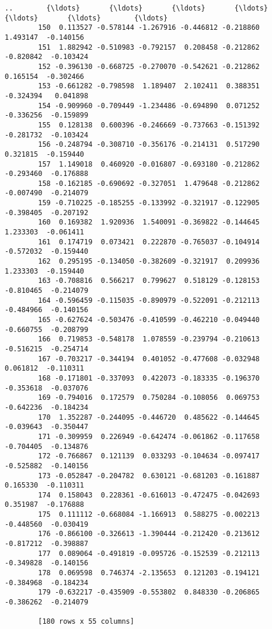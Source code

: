 \documentclass[11pt]{article}
\begin{document}
\begin{Verbatim}[commandchars=\\\{\}]
        ..        {\ldots}       {\ldots}       {\ldots}       {\ldots}       {\ldots}       {\ldots}        {\ldots}  
        150  0.113527 -0.578144 -1.267916 -0.446812 -0.218860  1.493147  -0.140156  
        151  1.882942 -0.510983 -0.792157  0.208458 -0.212862 -0.820842  -0.103424  
        152 -0.396130 -0.668725 -0.270070 -0.542621 -0.212862  0.165154  -0.302466  
        153 -0.661282 -0.798598  1.189407  2.102411  0.388351 -0.324394   0.041898  
        154 -0.909960 -0.709449 -1.234486 -0.694890  0.071252 -0.336256  -0.159899  
        155  0.128138  0.600396 -0.246669 -0.737663 -0.151392 -0.281732  -0.103424  
        156 -0.248794 -0.308710 -0.356176 -0.214131  0.517290  0.321815  -0.159440  
        157  1.149018  0.460920 -0.016807 -0.693180 -0.212862 -0.293460  -0.176888  
        158 -0.162185 -0.690692 -0.327051  1.479648 -0.212862 -0.007490  -0.214079  
        159 -0.710225 -0.185255 -0.133992 -0.321917 -0.122905 -0.398405  -0.207192  
        160  0.169382  1.920936  1.540091 -0.369822 -0.144645  1.233303  -0.061411  
        161  0.174719  0.073421  0.222870 -0.765037 -0.104914 -0.572032  -0.159440  
        162  0.295195 -0.134050 -0.382609 -0.321917  0.209936  1.233303  -0.159440  
        163 -0.708816  0.566217  0.799627  0.518129 -0.128153 -0.810465  -0.214079  
        164 -0.596459 -0.115035 -0.890979 -0.522091 -0.212113 -0.484966  -0.140156  
        165 -0.627624 -0.503476 -0.410599 -0.462210 -0.049440 -0.660755  -0.208799  
        166  0.719853 -0.548178  1.078559 -0.239794 -0.210613 -0.516215  -0.254714  
        167 -0.703217 -0.344194  0.401052 -0.477608 -0.032948  0.061812  -0.110311  
        168 -0.171801 -0.337093  0.422073 -0.183335 -0.196370 -0.353618  -0.037076  
        169 -0.794016  0.172579  0.750284 -0.108056  0.069753 -0.642236  -0.184234  
        170  1.352287 -0.244095 -0.446720  0.485622 -0.144645 -0.039643  -0.350447  
        171 -0.309959  0.226949 -0.642474 -0.061862 -0.117658 -0.704405  -0.134876  
        172 -0.766867  0.121139  0.033293 -0.104634 -0.097417 -0.525882  -0.140156  
        173 -0.052847 -0.204782  0.630121 -0.681203 -0.161887  0.165330  -0.110311  
        174  0.158043  0.228361 -0.616013 -0.472475 -0.042693  0.351987  -0.176888  
        175  0.111112 -0.668084 -1.166913  0.588275 -0.002213 -0.448560  -0.030419  
        176 -0.866100 -0.326613 -1.390444 -0.212420 -0.213612 -0.817212  -0.398887  
        177  0.089064 -0.491819 -0.095726 -0.152539 -0.212113 -0.349828  -0.140156  
        178  0.069598  0.746374 -2.135653  0.121203 -0.194121 -0.384968  -0.184234  
        179 -0.632217 -0.435909 -0.553802  0.848330 -0.206865 -0.386262  -0.214079  
        
        [180 rows x 55 columns]
\end{Verbatim}
            
\end{document}
